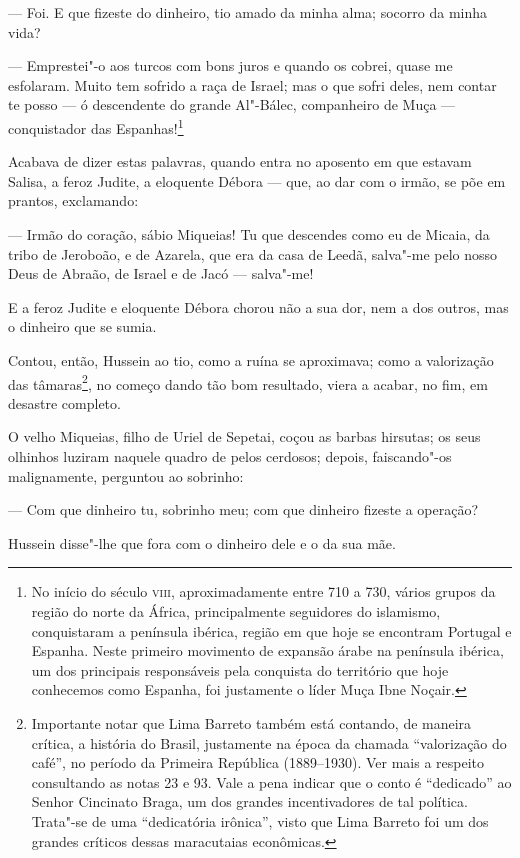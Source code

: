 --- Foi. E que fizeste do dinheiro, tio amado da minha alma; socorro da
minha vida?

--- Emprestei"-o aos turcos com bons juros e quando os cobrei, quase me
esfolaram. Muito tem sofrido a raça de Israel; mas o que sofri deles,
nem contar te posso --- ó descendente do grande Al"-Bálec, companheiro de
Muça --- conquistador das Espanhas!\footnote{No início do século \textsc{viii},
  aproximadamente entre 710 a 730, vários grupos da região do norte da
  África, principalmente seguidores do islamismo, conquistaram a
  península ibérica, região em que hoje se encontram Portugal e Espanha.
  Neste primeiro movimento de expansão árabe na península ibérica, um
  dos principais responsáveis pela conquista do território que hoje
  conhecemos como Espanha, foi justamente o líder Muça Ibne Noçair.}

Acabava de dizer estas palavras, quando entra no aposento em que estavam
Salisa, a feroz Judite, a eloquente Débora --- que, ao dar com o irmão,
se põe em prantos, exclamando:

--- Irmão do coração, sábio Miqueias! Tu que descendes como eu de
Micaia, da tribo de Jeroboão, e de Azarela, que era da casa de Leedã,
salva"-me pelo nosso Deus de Abraão, de Israel e de Jacó --- salva"-me!

E a feroz Judite e eloquente Débora chorou não a sua dor, nem a dos
outros, mas o dinheiro que se sumia.

Contou, então, Hussein ao tio, como a ruína se aproximava; como a
valorização das tâmaras\footnote{Importante notar que Lima Barreto
  também está contando, de maneira crítica, a história do Brasil,
  justamente na época da chamada ``valorização do café'', no período da
  Primeira República (1889--1930). Ver mais a respeito consultando as
  notas 23 e 93. Vale a pena indicar que o conto é ``dedicado'' ao
  Senhor Cincinato Braga, um dos grandes incentivadores de tal política.
  Trata"-se de uma ``dedicatória irônica'', visto que Lima Barreto foi um
  dos grandes críticos dessas maracutaias econômicas.}, no começo dando
tão bom resultado, viera a acabar, no fim, em desastre completo.

O velho Miqueias, filho de Uriel de Sepetai, coçou as barbas hirsutas;
os seus olhinhos luziram naquele quadro de pelos cerdosos; depois,
faiscando"-os malignamente, perguntou ao sobrinho:

--- Com que dinheiro tu, sobrinho meu; com que dinheiro fizeste a
operação?

Hussein disse"-lhe que fora com o dinheiro dele e o da sua mãe.

